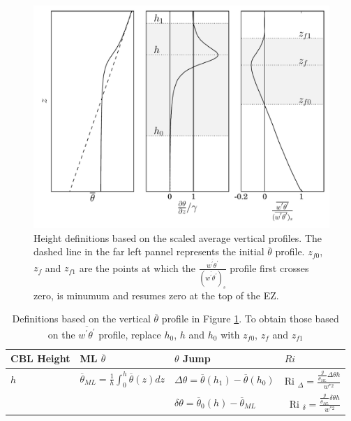 \begin{figure}[htbp]
    \centering
    
    \includegraphics[scale=.5]{figures/height_defs.pdf}
    \caption[Height Definitions]{Height definitions based on the scaled average vertical profiles. The dashed line in the far left pannel represents the initial $\overline{\theta}$ profile. $z_{f0}$, $z_{f}$ and $z_{f1}$ are the points at which the $\frac{\overline{w^{'}\theta^{'}}}{(\overline{w^{'}\theta^{'}})_{s}}$ profile first crosses zero, is minumum and resumes zero at the top of the EZ.}
    \label{fig:hdefs} 
\end{figure}

\begin{table}[htbp]
\caption[Height definitions]{Definitions based on the vertical $\overline{\theta}$ profile in Figure \ref{fig:hdefs}. To obtain those based on the $\overline{w^{'}\theta^{'}}$ profile, replace $h_{0}$, $h$ and $h_{0}$ with $z_{f0}$, $z_{f}$ and $z_{f1}$}


    \begin{tabular}{p{} p{} p{3cm} p{2.5cm}}
    
      CBL Height & ML $\overline{\theta}$ & $\theta$ Jump &$     Ri $\\ \hline 
       $h$ & $\overline{\theta}_{ML} = \frac{1}{h}\int^{h}_{0}\overline{\theta}(z)dz$ & $\Delta \theta=\overline{\theta}(h_{1})-\overline{\theta}(h_{0})$ &      Ri $_{\Delta}=\frac{\frac{g}{\overline{\theta}_{ML}}\Delta \theta h}{w^{*2}}$  \\ [.3cm] 
        
       & &$\delta \theta = \overline{\theta}_{0}(h)- \overline{\theta}_{ML}$ & \    Ri $_{\delta}=\frac{\frac{g}{\overline{\theta}_{ML}} \delta \theta h}{w^{*2}}$ \\ \hline
      \end{tabular}

\label{tab:reldefs}   
    
\end{table}

